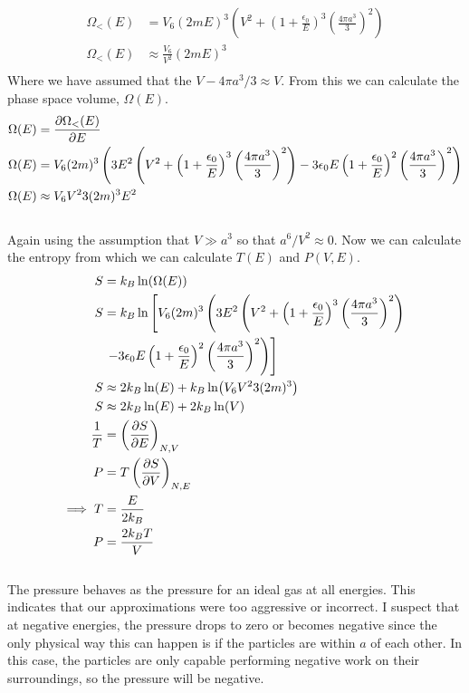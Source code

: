 \documentclass[]{book}
\begin{document}
\begin{enumerate}[1)]
\begin{equation}
\begin{split}
\Omega_<(E) & = V_6(2mE)^3 \left(V^2 +  \left(1+\frac{\epsilon_0}{E}\right)^3 \left(\frac{4\pi a^3}{3}\right)^2\right) \\ 
\Omega_<(E) & \approx \frac{V_6}{V^2}(2mE)^3 \\
\end{split}
\end{equation}
Where we have assumed that the $V - 4\pi a^3/3 \approx V$. From this we can calculate the phase space volume, $\Omega(E)$.
\begin{equation}
\begin{split}
\Omega(E) & = \pdv{\Omega_<(E)}{E} \\
\Omega(E) & = V_6 (2m)^3 \left( 3E^2 \left(V^2 +  \left(1+\frac{\epsilon_0}{E}\right)^3 \left(\frac{4\pi a^3}{3}\right)^2\right) - 3\epsilon_0E \left(1+\frac{\epsilon_0}{E}\right)^2 \left(\frac{4\pi a^3}{3}\right)^2\right) \\
\Omega(E) & \approx V_6V^2 3(2m)^3E^2 \\
\end{split}
\end{equation}\\
Again using the assumption that $V \gg a^3$ so that $a^6/V^2 \approx 0$. Now we can calculate the entropy from which we can calculate $T(E)$ and $P(V,E)$. 
\begin{equation}
\begin{split}
S & = k_B \ln( \Omega(E)) \\ 
S & = k_B \ln \left[ V_6 (2m)^3 \left( 3E^2 \left(V^2 +  \left(1+\frac{\epsilon_0}{E}\right)^3 \left(\frac{4\pi a^3}{3}\right)^2\right) \right.\right.  \\  & \left.\left. - 3\epsilon_0E \left(1+\frac{\epsilon_0}{E}\right)^2 \left(\frac{4\pi a^3}{3}\right)^2\right) \right] \\
S & \approx 2k_B\ln(E) + k_B\ln( V_6V^2 3(2m)^3) \\
S & \approx 2k_B\ln(E) + 2k_B\ln(V) \\
\frac{1}{T} & = \left( \pdv{S}{E}\right)_{N,V} \\
P & = T\left( \pdv{S}{V}\right)_{N,E} \\
\implies T & = \frac{E}{2k_B} \\
P & = \frac{2k_BT}{V} \\
\end{split}
\end{equation}\\
The pressure behaves as the pressure for an ideal gas at all energies. This indicates that our approximations were too aggressive or incorrect. I suspect that at negative energies, the pressure drops to zero or becomes negative since the only physical way this can happen is if the particles are within $a$ of each other. In this case, the particles are only capable performing negative work on their surroundings, so the pressure will be negative. \\

\end{enumerate}
\end{document}
